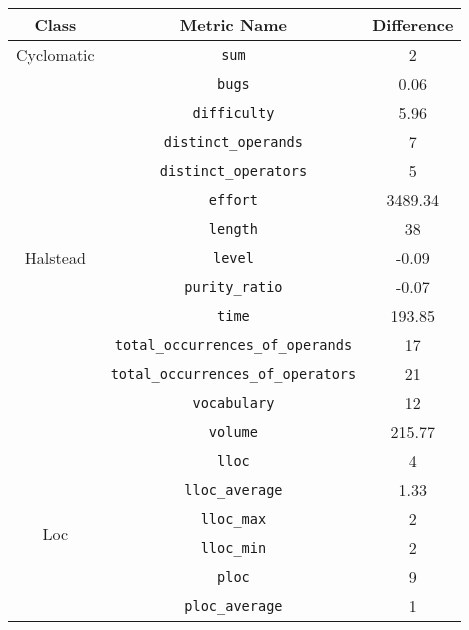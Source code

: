 \begin{center}
  \begin{tabular}{ |c|c|c| }
    \hline

    Class & Metric Name                           & Difference \\

    \hline

    \multirow{ 1 }{6em}{ Cyclomatic }
          & \verb|sum|                            & 2          \\
    \hline
    \multirow{ 13 }{6em}{ Halstead }
          & \verb|bugs|                           & 0.06       \\
          & \verb|difficulty|                     & 5.96       \\
          & \verb|distinct_operands|              & 7          \\
          & \verb|distinct_operators|             & 5          \\
          & \verb|effort|                         & 3489.34    \\
          & \verb|length|                         & 38         \\
          & \verb|level|                          & -0.09      \\
          & \verb|purity_ratio|                   & -0.07      \\
          & \verb|time|                           & 193.85     \\
          & \verb|total_occurrences_of_operands|  & 17         \\
          & \verb|total_occurrences_of_operators| & 21         \\
          & \verb|vocabulary|                     & 12         \\
          & \verb|volume|                         & 215.77     \\
    \hline
    \multirow{ 10 }{6em}{ Loc }
          & \verb|lloc|                           & 4          \\
          & \verb|lloc_average|                   & 1.33       \\
          & \verb|lloc_max|                       & 2          \\
          & \verb|lloc_min|                       & 2          \\
          & \verb|ploc|                           & 9          \\
          & \verb|ploc_average|                   & 1          \\

\end{tabular}
\end{center}

